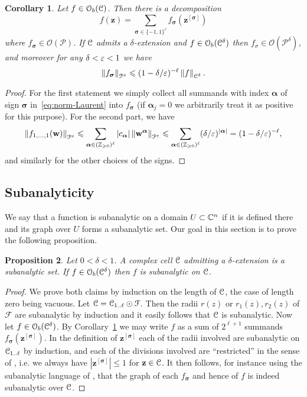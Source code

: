 \documentclass[reqno]{amsart}
\newtheorem{Cor}{Corollary}{\bfseries}{\itshape}
\newtheorem{Prop}[Cor]{Proposition}{\bfseries}{\itshape}
\renewcommand\ge{\geqslant} \renewcommand\le{\leqslant}
\renewcommand\~[1]{\widetilde{#1}}
\def\cP{{\mathcal P}} \def\cR{{\mathcal R}}
\def\cF{{\mathcal F}} \def\cL{{\mathcal L}} \def\cR{{\mathcal R}}
\def\cO{{\mathcal O}}
\def\vz{{\mathbf z}}
\def\vw{{\mathbf w}}
\def\vsigma{{\boldsymbol\sigma}}
\def\valpha{{\boldsymbol\alpha}}
\def\vsigma{{\boldsymbol\sigma}}
\begin{document}
\begin{Cor}\label{cor:laurent-disc-decmp}
  Let $f\in\cO_b(\cC)$. Then there is a decomposition
  \begin{equation}
    f(\vz) = \sum_{\vsigma\in\{-1,1\}^\ell} f_\vsigma(\vz^{[\vsigma]})
  \end{equation}
  where $f_\vsigma\in\cO(\cP)$. If ${\mathcal C}$ admits a $\delta$-extension
  and $f\in\cO_b(\cC^\delta)$ then $f_\sigma\in\cO(\cP^\delta)$, and
  moreover for any $\delta<\varepsilon<1$ we have
  \begin{equation}
    \norm{f_\vsigma}_{\cP^\e}\le(1-\delta/\e)^{-\ell}\norm{f}_{\cC^\delta}.
  \end{equation}
\end{Cor}
\begin{proof}
  For the first statement we simply collect all summands with index
  $\valpha$ of sign $\vsigma$ in~\eqref{eq:norm-Laurent} into
  $f_\vsigma$ (if $\valpha_j=0$ we arbitrarily treat it as positive
  for this purpose). For the second part, we have
  \begin{equation}
    \norm{f_{1,\ldots,1}(\vw)}_{\cP^\e}  \le \sum_{\valpha\in(\Z_{\ge0})^\ell} |c_\valpha| \norm{\vw^\valpha}_{\cP^\e}\le
    \sum_{\valpha\in(\Z_{\ge0})^\ell} (\delta/\e)^{|\valpha|}=(1-\delta/\e)^{-\ell},
  \end{equation}
  and similarly for the other choices of the signs.
\end{proof}


\subsection{Subanalyticity}

We say that a function is subanalytic on a domain $U\subset{\mathbb C}^n$ if it
is defined there and its graph over $U$ forms a subanalytic set. Our
goal in this section is to prove the following proposition.

\begin{Prop}\label{prop:cell-subanalytic}
  Let $0<\delta<1$. A complex cell ${\mathcal C}$ admitting a
  $\delta$-extension is a subanalytic set. If $f\in\cO_b(\cC^\delta)$
  then $f$ is subanalytic on ${\mathcal C}$.
\end{Prop}

\begin{proof}
  We prove both claims by induction on the length of ${\mathcal C}$, the case
  of length zero being vacuous. Let $\cC=\cC_{1..\ell}\odot\cF$.  Then
  the radii $r(z)$ or $r_1(z),r_2(z)$ of $\cF$ are subanalytic by
  induction and it easily follows that ${\mathcal C}$ is subanalytic. Now let
  $f\in\cO_b(\cC^\delta)$. By Corollary~\ref{cor:laurent-disc-decmp}
  we may write $f$ as a sum of $2^{\ell+1}$ summands
  $f_\vsigma(\vz^{[\vsigma]})$. In the definition of $\vz^{[\vsigma]}$
  each of the radii involved are subanalytic on ${\mathcal C}_{1..\ell}$ by
  induction, and each of the divisions involved are ``restricted'' in
  the sense of \cite{dvdd:subanalytic}, i.e. we always have
  $|\vz^{[\vsigma]}|\le 1$ for $\vz\in\cC$. It then follows, for
  instance using the subanalytic language of \cite{dvdd:subanalytic},
  that the graph of each $f_\vsigma$ and hence of $f$ is indeed
  subanalytic over ${\mathcal C}$.
\end{proof}
\end{document}
